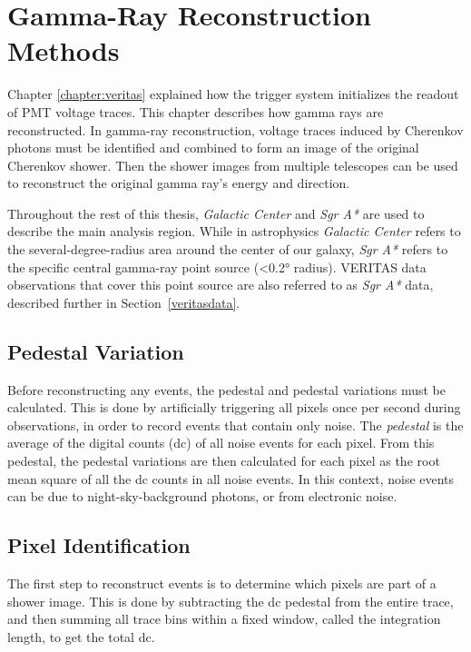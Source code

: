 \cleartooddpage[\thispagestyle{empty}]
\newcommand{\ETrue}{$\textrm{E}_{\textrm{True}}$}

\chapter{Gamma-Ray Reconstruction Methods}\label{ch:grrecon}

Chapter \ref{chapter:veritas} explained how the trigger system initializes the readout of PMT voltage traces.
This chapter describes how gamma rays are reconstructed.
In gamma-ray reconstruction, voltage traces induced by Cherenkov photons must be identified and combined to form an image of the original Cherenkov shower.
Then the shower images from multiple telescopes can be used to reconstruct the original gamma ray's energy and direction.

Throughout the rest of this thesis, \textit{Galactic Center} and \textit{Sgr A*} are used to describe the main analysis region.
While in astrophysics \textit{Galactic Center} refers to the several-degree-radius area around the center of our galaxy, \textit{Sgr A*} refers to the specific central gamma-ray point source (<\ang{0.2} radius).
VERITAS data observations that cover this point source are also referred to as \textit{Sgr A*} data, described further in Section~\ref{veritasdata}.


\section{Pedestal Variation}
Before reconstructing any events, the pedestal and pedestal variations must be calculated.
This is done by artificially triggering all pixels once per second during observations, in order to record events that contain only noise.
The \textit{pedestal} is the average of the digital counts (dc) of all noise events for each pixel.
From this pedestal, the pedestal variations are then calculated for each pixel as the root mean square of all the dc counts in all noise events.
In this context, noise events can be due to night-sky-background photons, or from electronic noise.

\section{Pixel Identification}
The first step to reconstruct events is to determine which pixels are part of a shower image.
This is done by subtracting the dc pedestal from the entire trace, and then summing all trace bins within a fixed window, called the integration length, to get the total dc.

